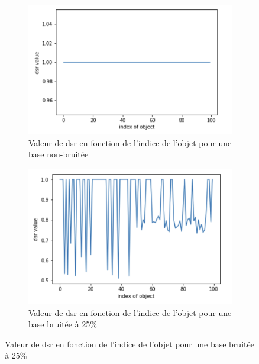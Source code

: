 \documentclass[a4paper]{article}
\begin{document}
\begin{figure}[H]
	\centering
    \begin{subfigure}[c]{0.46\textwidth}
	    \centering
        \includegraphics[width=\textwidth]{images/dsr_0.png}
        \caption{Valeur de dsr en fonction de l'indice de l'objet pour une base
        non-bruitée}
        \label{img:dsr0}
    \end{subfigure}
    \begin{subfigure}[c]{0.46\textwidth}
	    \centering
	    \includegraphics[width=\textwidth]{images/dsr_25.png}
        \caption{Valeur de dsr en fonction de l'indice de l'objet pour une base
        bruitée à 25\%}
        \label{img:dsr25}
    \end{subfigure}


\end{figure}
\end{document}
